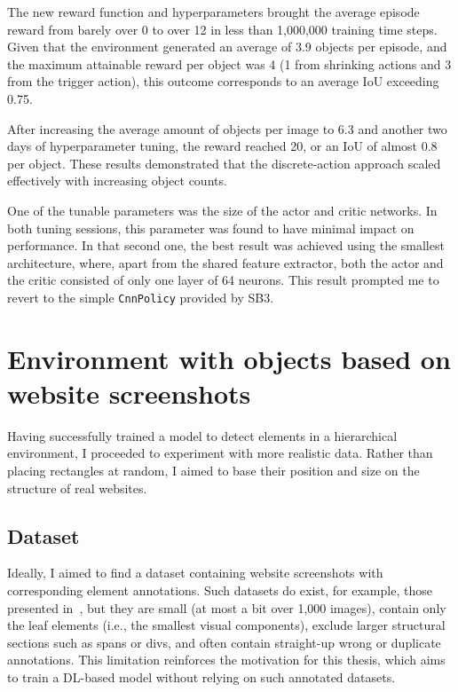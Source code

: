\documentclass[
  digital,     %
  oneside,     %
  nosansbold,  %
  nocolorbold, %
  lof,         %
  lot,         %
]{fithesis4}
\begin{document}
The new reward function and hyperparameters brought the average episode reward from barely over 0 to over 12 in less than 1,000,000 training time steps. Given that the environment generated an average of 3.9 objects per episode, and the maximum attainable reward per object was 4 (1 from shrinking actions and 3 from the trigger action), this outcome corresponds to an average IoU exceeding 0.75.

After increasing the average amount of objects per image to 6.3 and another two days of hyperparameter tuning, the reward reached 20, or an IoU of almost 0.8 per object. These results demonstrated that the discrete-action approach scaled effectively with increasing object counts.

One of the tunable parameters was the size of the actor and critic networks. In both tuning sessions, this parameter was found to have minimal impact on performance. In that second one, the best result was achieved using the smallest architecture, where, apart from the shared feature extractor, both the actor and the critic consisted of only one layer of 64 neurons. This result prompted me to revert to the simple \texttt{CnnPolicy} provided by SB3.

\section{Environment with objects based on website screenshots}

Having successfully trained a model to detect elements in a hierarchical environment, I proceeded to experiment with more realistic data. Rather than placing rectangles at random, I aimed to base their position and size on the structure of real websites.

\subsection{Dataset}
\label{subsec:dataset}

Ideally, I aimed to find a dataset containing website screenshots with corresponding element annotations. Such datasets do exist, for example, those presented in~\cite{roboflow-dataset-1, roboflow-dataset-2}, but they are small (at most a bit over 1,000 images), contain only the leaf elements (i.e., the smallest visual components), exclude larger structural sections such as spans or divs, and often contain straight-up wrong or duplicate annotations. This limitation reinforces the motivation for this thesis, which aims to train a DL-based model without relying on such annotated datasets.
\end{document}
